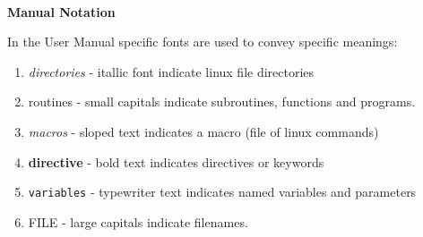 
~

\vspace{1.5 in}
\centerline{{\bf Manual Notation}}
\vspace{1 in}
In the \D{} User Manual specific fonts are used to
convey specific meanings:
\begin{enumerate}
\item {\em directories} - itallic font indicate linux file directories
\item {\sc routines} - small capitals indicate subroutines, functions and
programs.
\item {\sl macros} - sloped text indicates a macro (file of linux commands)
\item {\bf directive} - bold text indicates directives or keywords
\item {\tt variables} - typewriter text indicates named variables and parameters
\item {FILE} - large capitals indicate filenames.
\end{enumerate}

\clearpage
